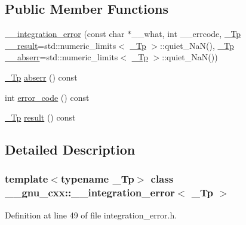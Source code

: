 \subsection*{Public Member Functions}
\begin{DoxyCompactItemize}
\item 
\hyperlink{class____gnu__cxx_1_1____integration__error_a4a635205d93f9a0c5d3317903c46d3fd}{\+\_\+\+\_\+integration\+\_\+error} (const char $\ast$\+\_\+\+\_\+what, int \+\_\+\+\_\+errcode, \hyperlink{namespace____gnu__cxx_a3b19a9c800ca194374ef9172290f7d79}{\+\_\+\+Tp} \hyperlink{namespace____gnu__cxx_a500ea9f53aeaecd8c2ae657503450578}{\+\_\+\+\_\+result}=std\+::numeric\+\_\+limits$<$ \hyperlink{namespace____gnu__cxx_a3b19a9c800ca194374ef9172290f7d79}{\+\_\+\+Tp} $>$\+::quiet\+\_\+\+NaN(), \hyperlink{namespace____gnu__cxx_a3b19a9c800ca194374ef9172290f7d79}{\+\_\+\+Tp} \hyperlink{namespace____gnu__cxx_a72f736cff127f1574e91a301de9e074b}{\+\_\+\+\_\+abserr}=std\+::numeric\+\_\+limits$<$ \hyperlink{namespace____gnu__cxx_a3b19a9c800ca194374ef9172290f7d79}{\+\_\+\+Tp} $>$\+::quiet\+\_\+\+NaN())
\item 
\hyperlink{namespace____gnu__cxx_a3b19a9c800ca194374ef9172290f7d79}{\+\_\+\+Tp} \hyperlink{class____gnu__cxx_1_1____integration__error_a0194cc847bfbe439a8a1b41cda1d8572}{abserr} () const
\item 
int \hyperlink{class____gnu__cxx_1_1____integration__error_a930f87a4a99140366df637260a2e5929}{error\+\_\+code} () const
\item 
\hyperlink{namespace____gnu__cxx_a3b19a9c800ca194374ef9172290f7d79}{\+\_\+\+Tp} \hyperlink{class____gnu__cxx_1_1____integration__error_abc65cbc56e30b33859f9df92aaf8b636}{result} () const
\end{DoxyCompactItemize}


\subsection{Detailed Description}
\subsubsection*{template$<$typename \+\_\+\+Tp$>$\newline
class \+\_\+\+\_\+gnu\+\_\+cxx\+::\+\_\+\+\_\+integration\+\_\+error$<$ \+\_\+\+Tp $>$}



Definition at line 49 of file integration\+\_\+error.\+h.



